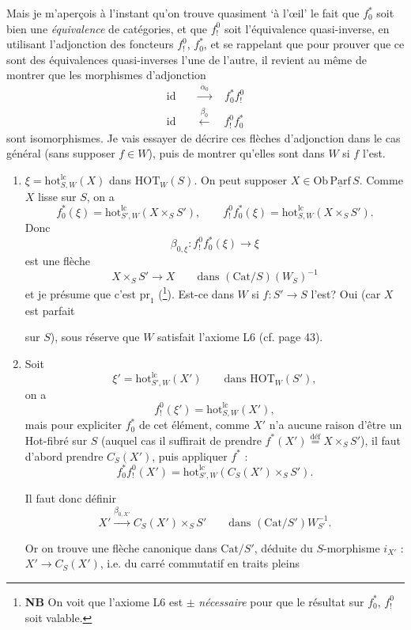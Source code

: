 \documentclass[11pt]{article}
\newcommand{\printedpage}[1]{\marginpar{\footnotesize p.~#1}}
\newcommand{\msp}[1]{\marginpar{\footnotesize [#1]}}
\newcommand{\HOT}{\mathrm{HOT}}
\newcommand{\hot}{\mathrm{hot}}
\newcommand{\Cat}{\mathrm{Cat}}
\begin{document}
\printedpage{98}
\msp{160}
Mais je m'aperçois à l'instant qu'on trouve quasiment ‘à l'œil’ le fait que $f_0^*$ soit bien une \textit{équivalence} de catégories, et que $f_!^0$ soit l'équivalence quasi-inverse, en utilisant l'adjonction des foncteurs $f_!^0$, $f_0^*$, et se rappelant que pour prouver que ce sont des équivalences quasi-inverses l'une de l'autre, il revient au même de montrer que les morphismes d'adjonction
\[\begin{aligned}
\mathrm{id}&\quad\xrightarrow{\ \alpha_0\ }\quad f_0^*f_!^0\\
\mathrm{id}&\quad\xleftarrow{\ \beta_0\ }\quad f_!^0f_0^*
\end{aligned}\]
sont isomorphismes. Je vais essayer de décrire ces flèches d'adjonction dans le cas général (sans supposer $f\in W$), puis de montrer qu'elles sont dans $W$ si $f$ l'est.

\begin{enumerate}
\item[] $\xi=\hot^{\mathrm{lc}}_{S,W}(X)$ dans $\HOT_W(S)$. On peut supposer $X\in\mathrm{Ob}\,\underline{\mathrm{Parf}}\,S$. Comme $X$ lisse sur $S$, on a
\[f_0^*(\xi)=\hot^{\mathrm{lc}}_{S',W}(X\times_S S'),\qquad f_!^0f_0^*(\xi)=\hot^{\mathrm{lc}}_{S,W}(X\times_S S').\]
Donc
\[\beta_{0,\xi} : f_!^0f_0^*(\xi)\longrightarrow\xi\]
est une flèche
\[X\times_S S'\longrightarrow X\qquad\text{dans }(\Cat/S)(W_S)^{-1}\]
et je présume que c'est $\mathrm{pr}_1$ (\footnote[78]{\textbf{NB} On voit que l'axiome L6 est $\pm$ \textit{nécessaire} pour que le résultat sur $f_0^*$, $f_!^0$ soit valable.}). Est-ce dans $W$ si $f : S'\longrightarrow S$ l'est? Oui (car $X$ est parfait

\msp{161}

sur $S$), sous réserve que $W$ satisfait l'axiome L6 (cf. page 43).

\item[2)] Soit
\[\xi'=\hot^{\mathrm{lc}}_{S',W}(X')\qquad\text{dans }\HOT_W(S'),\]
on a
\[f_!^0(\xi')=\hot^{\mathrm{lc}}_{S,W}(X'),\]
mais pour expliciter $f_0^*$ de cet élément, comme $X'$ n'a aucune raison d'être un Hot-fibré sur $S$ (auquel cas il suffirait de prendre $f^*(X')\overset{\text{déf}}{=}X\times_S S'$), il faut d'abord prendre $C_S(X')$, puis appliquer $f^*$ :
\[f_0^*f_!^0(X')=\hot^{\mathrm{lc}}_{S',W}(C_S(X')\times_S S').\]

Il faut donc définir
\[X'\xrightarrow{\beta_{0,X'}}C_S(X')\times_S S'\qquad\text{dans }(\Cat/S')W_{S'}^{-1}.\]

Or on trouve une flèche canonique dans $\Cat/S'$, déduite du $S$-morphisme $i_{X'}$ : $X'\longrightarrow C_S(X')$, i.e. du carré commutatif en traits pleins
\end{enumerate}
\end{document}
